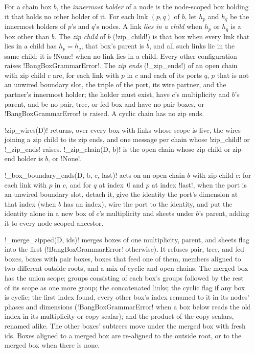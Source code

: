 \begin{definition}\label{def:diagrams-zip}
For a chain box $b$, the \emph{innermost holder} of a node is the node-scoped box holding it that holds no other holder of it. For each link $(p,q)$ of $b$, let $h_p$ and $h_q$ be the innermost holders of $p$'s and $q$'s nodes. A link \emph{lies in a child} when $h_p$ or $h_q$ is a box other than $b$. The \emph{zip child} of $b$ (\py!zip_child!) is that box when every link that lies in a child has $h_p=h_q$, that box's parent is $b$, and all such links lie in the same child; it is \py!None! when no link lies in a child. Every other configuration raises \py!BangBoxGrammarError!. The \emph{zip ends} (\py!_zip_ends!) of an open chain with zip child $c$ are, for each link with $p$ in $c$ and each of its ports $q$, $p$ that is not an unwired boundary slot, the triple of the port, its wire partner, and the partner's innermost holder; the holder must exist, have $c$'s multiplicity and $b$'s parent, and be no pair, tree, or fed box and have no pair boxes, or \py!BangBoxGrammarError! is raised. A cyclic chain has no zip ends.
\end{definition}

\py!zip_wires(D)! returns, over every box with links whose scope is live, the wires joining a zip child to its zip ends, and one message per chain whose \py!zip_child! or \py!_zip_ends! raises. \py!_zip_chain(D, b)! is the open chain whose zip child or zip-end holder is $b$, or \py!None!.

\begin{definition}\label{def:diagrams-box-ends}
\py!_box_boundary_ends(D, b, c, last)! acts on an open chain $b$ with zip child $c$: for each link with $p$ in $c$, and for $q$ at index~$0$ and $p$ at index \py!last!, when the port is an unwired boundary slot, detach it, give the identity the port's dimension at that index (when $b$ has an index), wire the port to the identity, and put the identity alone in a new box of $c$'s multiplicity and sheets under $b$'s parent, adding it to every node-scoped ancestor.
\end{definition}

\begin{definition}\label{def:diagrams-merge-zipped}
\py!_merge_zipped(D, ids)! merges boxes of one multiplicity, parent, and sheets flag into the first (\py!BangBoxGrammarError! otherwise). It refuses pair, tree, and fed boxes, boxes with pair boxes, boxes that feed one of them, members aligned to two different outside roots, and a mix of cyclic and open chains. The merged box has the union scope; groups consisting of each box's groups followed by the rest of its scope as one more group; the concatenated links; the cyclic flag if any box is cyclic; the first index found, every other box's index renamed to it in its nodes' phases and dimensions (\py!BangBoxGrammarError! when a box below reads the old index in its multiplicity or copy scalar); and the product of the copy scalars, renamed alike. The other boxes' subtrees move under the merged box with fresh ids. Boxes aligned to a merged box are re-aligned to the outside root, or to the merged box when there is none.
\end{definition}

